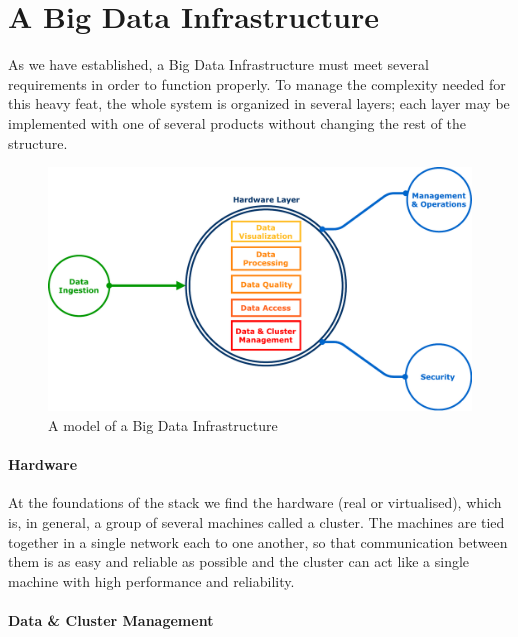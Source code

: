 \section{A Big Data Infrastructure}

As we have established, a Big Data Infrastructure must meet several requirements in order to function properly. 
To manage the complexity needed for this heavy feat, the whole system is organized in several layers; each layer may be implemented with one of several products without changing the rest of the structure.

\begin{figure}
	\centering
	\includegraphics[scale=0.6]{Figures/stack_infrastructure}
	\decoRule
	\caption[Infrastructural Stack]{A model of a Big Data Infrastructure}
	\label{fig:InfrastructuralStack}
\end{figure}

\paragraph{Hardware}

At the foundations of the stack we find the hardware (real or virtualised), which is, in general, a group of several machines called a cluster.\newline
The machines are tied together in a single network each to one another, so that communication between them is as easy and reliable as possible and the cluster can act like a single machine with high performance and reliability.

\paragraph{Data \& Cluster Management}

